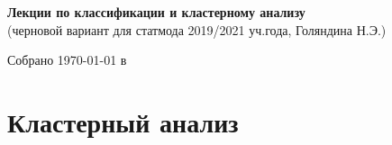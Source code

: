 \documentclass[12pt,a4paper]{article}
\newcommand{\Header}{
  \begin{center}
    {\Large\bf
     Лекции по классификации и кластерному анализу
      }\\
      (черновой вариант для статмода 2019/2021 уч.года, Голяндина Н.Э.)
      
    \vspace{0.7em}
    {Собрано {\today} в {\currenttime}}
  \end{center}

  \vspace{1em}
  \pagebreak
}
\begin{document}
\Header
      
      
     \section{Кластерный анализ}
     
     
\end{document}

